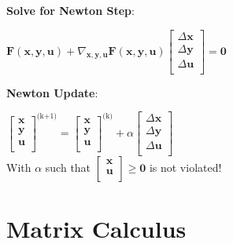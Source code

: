 \documentclass[english]{latex4ei/latex4ei_sheet}
\begin{document}
\begin{sectionbox}
	\textbf{Solve for Newton Step}:
	\begin{center}
		$\bm{F}(\bm{x}, \bm{y}, \bm{u}) + \nabla_{\bm{x}, \bm{y}, \bm{u}}\bm{F}(\bm{x}, \bm{y}, \bm{u}) \begin{bmatrix}
			\Delta \bm{x} \\
			\Delta \bm{y} \\
			\Delta \bm{u} \\
		\end{bmatrix} = \bm{0}$
	\end{center}
	\vspace{0.5em}
	
	\textbf{Newton Update}:
	\begin{center}
		$\begin{bmatrix}
			\bm{x} \\
			\bm{y} \\
			\bm{u} \\
		\end{bmatrix}^{\text{(k+1)}} = \begin{bmatrix}
		\bm{x} \\
		\bm{y} \\
		\bm{u} \\
	\end{bmatrix}^{\text{(k)}} + \alpha \begin{bmatrix}
	\Delta \bm{x} \\
	\Delta \bm{y} \\
	\Delta \bm{u} \\
\end{bmatrix}$ \\
		\vspace{0.5em}
		With $\alpha$ such that $\begin{bmatrix}
			\bm{x} \\
			\bm{u} \\
		\end{bmatrix} \geq \bm{0}$ is not violated!
	\end{center}
	
\end{sectionbox}

\pagebreak

\section{Matrix Calculus}
\end{document}
